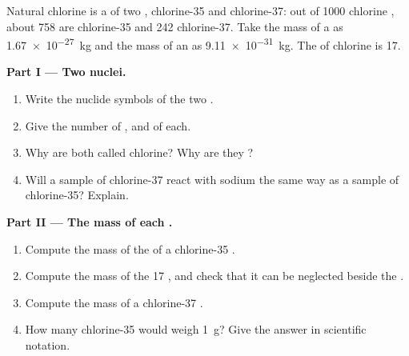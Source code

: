 \begin{problem}
\label{pb:g9:inside-the-atom:1}
Natural chlorine is a  of two , chlorine-35 and
chlorine-37: out of 1000 chlorine , about 758 are chlorine-35 and
242 chlorine-37. Take the mass of a  as \qty{1.67e-27}{kg} and
the mass of an  as \qty{9.11e-31}{kg}. The  of
chlorine is 17.

\medskip
\noindent\textbf{Part I --- Two nuclei.}
\begin{enumerate}
  \item Write the nuclide symbols of the two .
  \item Give the number of ,  and  of each.
  \item Why are both called chlorine? Why are they ?
  \item Will a sample of chlorine-37 react with sodium the same way as a
        sample of chlorine-35? Explain.
\end{enumerate}

\medskip
\noindent\textbf{Part II --- The mass of each .}
\begin{enumerate}[resume]
  \item Compute the mass of the  of a chlorine-35 .
  \item Compute the mass of the 17 , and check that it can be
        neglected beside the .
  \item Compute the mass of a chlorine-37 .
  \item How many chlorine-35  would weigh \qty{1}{g}? Give the
        answer in scientific notation.
\end{enumerate}


\end{problem}
